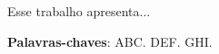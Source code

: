 \newpage
\begin{resumo}
 Esse trabalho apresenta... 
 \vspace{\onelineskip}
 
 \noindent
 \textbf{Palavras-chaves}: ABC. DEF. GHI.
\end{resumo}
\newpage
